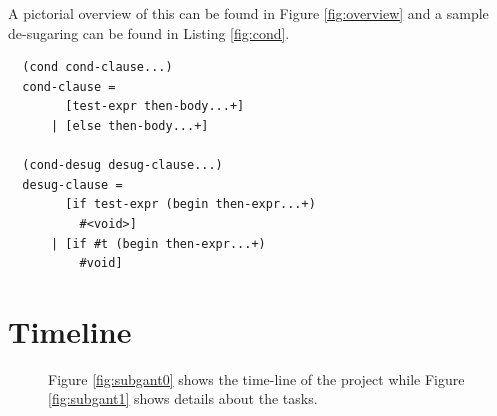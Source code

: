\documentclass[twoside]{article}
\begin{document}
\begin{multicols}{2}
A pictorial overview of this can be found in Figure
\ref{fig:overview} and a sample de-sugaring can be found in Listing
\ref{fig:cond}.


\begin{lstlisting}
  (cond cond-clause...)
  cond-clause =
        [test-expr then-body...+]
      | [else then-body...+]

  (cond-desug desug-clause...)
  desug-clause =
        [if test-expr (begin then-expr...+)
          #<void>]
      | [if #t (begin then-expr...+)
          #void]
\end{lstlisting}
\section{Timeline}
\begin{figure}[ht!]
  \centering
  
  \caption [Gantt chart showing the prosed project time-line and notes.]
           {Figure \ref{fig:subgant0} shows the time-line of the
             project while Figure \ref{fig:subgant1} shows details
             about the tasks.}
  \label{fig:gantt}
\end{figure}


\end{multicols}
\end{document}
